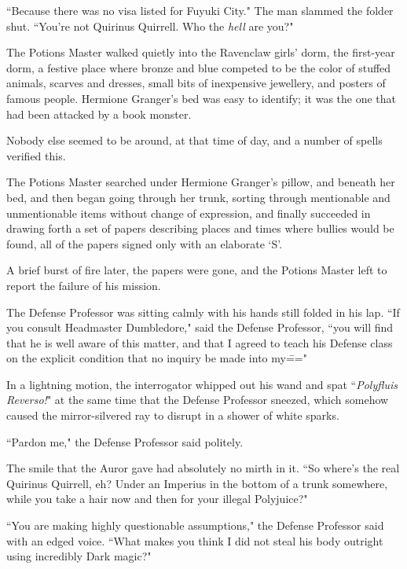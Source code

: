 ``Because there was no visa listed for Fuyuki City." The man slammed the folder shut. ``You're not Quirinus Quirrell. Who the \emph{hell} are you?"

\later

The Potions Master walked quietly into the Ravenclaw girls' dorm, the first-year dorm, a festive place where bronze and blue competed to be the color of stuffed animals, scarves and dresses, small bits of inexpensive jewellery, and posters of famous people. Hermione Granger's bed was easy to identify; it was the one that had been attacked by a book monster.

Nobody else seemed to be around, at that time of day, and a number of spells verified this.

The Potions Master searched under Hermione Granger's pillow, and beneath her bed, and then began going through her trunk, sorting through mentionable and unmentionable items without change of expression, and finally succeeded in drawing forth a set of papers describing places and times where bullies would be found, all of the papers signed only with an elaborate `S'.

A brief burst of fire later, the papers were gone, and the Potions Master left to report the failure of his mission.

\later

The Defense Professor was sitting calmly with his hands still folded in his lap. ``If you consult Headmaster Dumbledore," said the Defense Professor, ``you will find that he is well aware of this matter, and that I agreed to teach his Defense class on the explicit condition that no inquiry be made into my\==="

In a lightning motion, the interrogator whipped out his wand and spat ``\emph{Polyfluis Reverso!}" at the same time that the Defense Professor sneezed, which somehow caused the mirror-silvered ray to disrupt in a shower of white sparks.

``Pardon me," the Defense Professor said politely.

The smile that the Auror gave had absolutely no mirth in it. ``So where's the real Quirinus Quirrell, eh? Under an Imperius in the bottom of a trunk somewhere, while you take a hair now and then for your illegal Polyjuice?"

``You are making highly questionable assumptions," the Defense Professor said with an edged voice. ``What makes you think I did not steal his body outright using incredibly Dark magic?"

